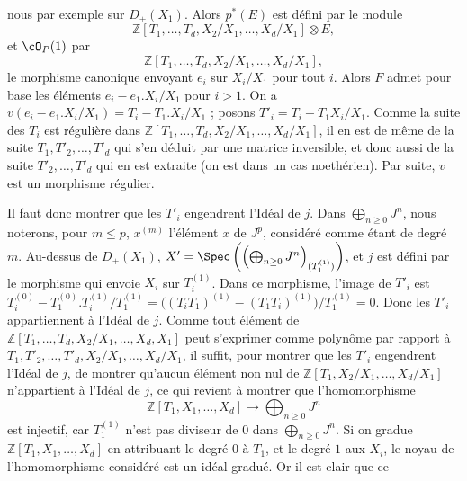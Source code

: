 nous par exemple sur \(D_+(X_1)\). Alors \(p^*(E)\) est défini par le module
\[
 \mathbb Z[T_1,\ldots,T_d,X_2/X_1,\ldots,X_d/X_1]\otimes E,
\]
et \(\cO_P(1)\) par
\[
 \mathbb Z[T_1,\ldots,T_d,X_2/X_1,\ldots,X_d/X_1],
\]
le morphisme canonique envoyant \(e_i\) sur \(X_i/X_1\) pour tout \(i\). Alors \(F\) admet pour base les éléments \(e_i-e_1.X_i/X_1\) pour \(i>1\).
On a \(v(e_i-e_1.X_i/X_1)=T_i-T_1.X_i/X_1\) ; posons \(T'_i=T_i-T_1X_i/X_1\).
Comme la suite des \(T_i\) est régulière dans \(\mathbb Z[T_1,\ldots,T_d,X_2/X_1,\ldots,X_d/X_1]\), il en est de même de la suite \(T_1,T'_2,\ldots,T'_d\) qui s'en déduit par une matrice inversible, et donc aussi de la suite \(T'_2,\ldots,T'_d\) qui en est extraite (on est dans un cas noethérien). Par suite, \(v\) est un morphisme régulier.

Il faut donc montrer que les \(T'_i\) engendrent l'Idéal de \(j\). Dans \(\bigoplus_{n\ge0}J^n\), nous noterons, pour \(m\le p\), \(x^{(m)}\) l'élément \(x\) de \(J^p\), considéré comme étant de degré \(m\). Au-dessus de \(D_+(X_1)\), \(X'=\Spec\left(\left(\bigoplus_{n\ge0}J^n\right)_{(T_1^{(1)})}\right)\), et \(j\) est défini par le morphisme qui envoie \(X_i\) sur \(T_i^{(1)}\). Dans ce morphisme, l'image de \(T'_i\) est \(T_i^{(0)}-T_1^{(0)}.T_i^{(1)}/T_1^{(1)}=\bigl((T_iT_1)^{(1)}-(T_1T_i)^{(1)}\bigr)/T_1^{(1)}=0\). Donc les \(T'_i\) appartiennent à l'Idéal de \(j\). Comme tout élément de \(\mathbb Z[T_1,\ldots,T_d,X_2/X_1,\ldots,X_d,X_1]\) peut s'exprimer comme polynôme par rapport à \(T_1,T'_2,\ldots,T'_d,X_2/X_1,\ldots,X_d/X_1\), il suffit, pour montrer que les \(T'_i\) engendrent l'Idéal de \(j\), de montrer qu'aucun élément non nul de \(\mathbb Z[T_1,X_2/X_1,\ldots,X_d/X_1]\) n'appartient à l'Idéal de \(j\), ce qui revient à montrer que l'homomorphisme
\[
\mathbb Z[T_1,X_1,\ldots,X_d]\longrightarrow\bigoplus_{n\ge0}J^n
\]
est injectif, car \(T_1^{(1)}\) n'est pas diviseur de 0 dans \(\bigoplus_{n\ge0}J^n\). Si on gradue \(\mathbb Z[T_1,X_1,\ldots,X_d]\) en attribuant le degré \(0\) à \(T_1\), et le degré \(1\) aux \(X_i\), le noyau de l'homomorphisme considéré est un idéal gradué. Or il est clair que ce
